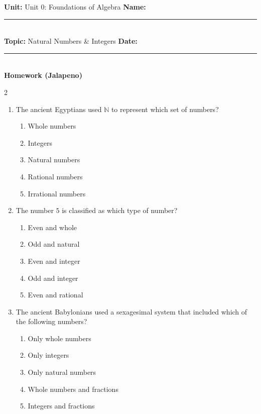 \documentclass[10pt]{article}
\begin{document}
\enlargethispage{2.5cm}

\begin{tcolorbox}[colback=mainblue!5, colframe=mainblue, sharp corners, boxrule=0.5pt]
    \small \textbf{Unit:} Unit 0: Foundations of Algebra \hfill \textbf{Name:} \rule{3cm}{0.4pt} \\
    \small \textbf{Topic:} Natural Numbers & Integers \hfill \textbf{Date:} \rule{2cm}{0.4pt} \\
    \centering \textbf{\large Homework (Jalapeno)}
\end{tcolorbox}

\vspace{0.2cm}

\begin{multicols}{2}
\begin{enumerate}[label=\textbf{Q\arabic*.}, leftmargin=*, itemsep=6pt, parsep=0pt]

  \item \small The ancient Egyptians used $\mathbb{N}$ to represent which set of numbers?
  \begin{enumerate}[label=(\Alph*), leftmargin=0.6cm, nosep, itemsep=2pt]
    \item Whole numbers
    \item Integers
    \item Natural numbers
    \item Rational numbers
    \item Irrational numbers
  \end{enumerate}

  \item \small The number $5$ is classified as which type of number?
  \begin{enumerate}[label=(\Alph*), leftmargin=0.6cm, nosep, itemsep=2pt]
    \item Even and whole
    \item Odd and natural
    \item Even and integer
    \item Odd and integer
    \item Even and rational
  \end{enumerate}

  \item \small The ancient Babylonians used a sexagesimal system that included which of the following numbers?
  \begin{enumerate}[label=(\Alph*), leftmargin=0.6cm, nosep, itemsep=2pt]
    \item Only whole numbers
    \item Only integers
    \item Only natural numbers
    \item Whole numbers and fractions
    \item Integers and fractions
  \end{enumerate}


\end{enumerate}
\end{multicols}
\end{document}
